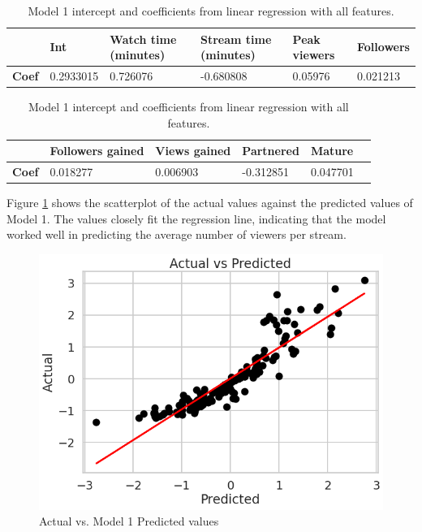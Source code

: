 \documentclass[runningheads]{llncs}
\begin{document}
\begin{table}[h]
    \centering
    \caption{Model 1 intercept and coefficients from linear regression with all features.}
    \begingroup
    \setlength{\tabcolsep}{8pt} %
    \renewcommand{\arraystretch}{1.2} %
    
    \begin{tabular}{|p{.10\linewidth}|p{.12\linewidth}| p{.15\linewidth}|p{.15\linewidth}|p{.10\linewidth}|p{.14\linewidth}|}
        \hline
      & \textbf{Int} & \textbf{Watch time (minutes)} & \textbf{Stream time (minutes)} &	\textbf{Peak viewers}	& \textbf{Followers} \\
     \hline
     \textbf{Coef} & 0.2933015 & 0.726076 & -0.680808	& 0.05976	& 0.021213 \\
     \hline
     \end{tabular}
    
    \begin{tabular}{|p{.10\linewidth}|p{.12\linewidth}| p{.15\linewidth}|p{.15\linewidth}|p{.10\linewidth}|p{.14\linewidth}|}
        \hline
      & \textbf{Followers gained} & \textbf{Views gained} & \textbf{Partnered} & \textbf{Mature} &  \\
     \hline
     \textbf{Coef} & 0.018277	& 0.006903	& -0.312851	& 0.047701 & \\
    \hline
    \end{tabular}
    \label{tab:model1}
    \endgroup

\end{table}

Figure \ref{fig:model1} shows the scatterplot of the actual values against the predicted values of Model 1. The values closely fit the regression line, indicating that the model worked well in predicting the average number of viewers per stream. \\

\begin{figure}[h]
    \centering
    \includegraphics[width=0.6\linewidth]{figures/graphs/model_1_graph.png}
    \caption{Actual vs. Model 1 Predicted values }
  \label{fig:model1}
\end{figure}
\end{document}
